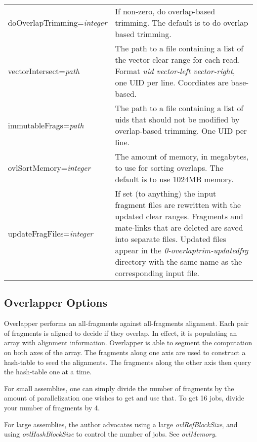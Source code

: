 \documentclass[twoside,11pt]{article}
\begin{document}
\begin{longtable}{lp{3.0in}}
doOverlapTrimming={\it integer} &
If non-zero, do overlap-based trimming.  The default is to do overlap
based trimming.
\\

vectorIntersect={\it path} &
The path to a file containing a list of the vector clear range for
each read.  Format {\it uid vector-left vector-right}, one UID per
line.  Coordiates are base-based.
\\

immutableFrags={\it path} &
The path to a file containing a list of uids that should not be
modified by overlap-based trimming.  One UID per line.
\\

ovlSortMemory={\it integer} &
The amount of memory, in megabytes, to use for sorting overlaps.  The
default is to use 1024MB memory.
\\

updateFragFiles={\it integer} &
If set (to anything) the input fragment files are rewritten with the
updated clear ranges.  Fragments and mate-links that are deleted are
saved into separate files.  Updated files appear in the {\it
0-overlaptrim-updatedfrg} directory with the same name as the
corresponding input file.
\\
\end{longtable}



\subsection{Overlapper Options}
\label{sec:overlapopts}

Overlapper performs an all-fragments against all-fragments alignment.
Each pair of fragments is aligned to decide if they overlap.  In
effect, it is populating an array with alignment information.
Overlapper is able to segment the computation on both axes of the
array.  The fragments along one axis are used to construct a
hash-table to seed the alignments.  The fragments along the other axis
then query the hash-table one at a time.

For small assemblies, one can simply divide the number of fragments by
the amount of parallelization one wishes to get and use that.  To get
16 jobs, divide your number of fragments by 4.

For large assemblies, the author advocates using a large {\it
ovlRefBlockSize}, and using {\it ovlHashBlockSize} to control the number of
jobs.  See {\it ovlMemory}.
\end{document}
